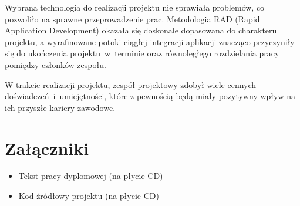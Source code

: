 Wybrana technologia do realizacji projektu nie sprawiała problemów, co pozwoliło na sprawne przeprowadzenie prac.
Metodologia RAD (Rapid Application Development) okazała się doskonale dopasowana do charakteru projektu, a wyrafinowane potoki ciągłej integracji aplikacji znacząco przyczyniły się do ukończenia projektu~w~terminie oraz równoległego rozdzielania pracy pomiędzy członków zespołu.

W trakcie realizacji projektu, zespół projektowy zdobył wiele cennych doświadczeń~i~umiejętności, które z pewnością będą miały pozytywny wpływ na ich przyszłe kariery zawodowe.

\chapter*{Załączniki}
\begin{itemize}
    \item Tekst pracy dyplomowej (na płycie CD)
    \item Kod źródłowy projektu (na płycie CD)
\end{itemize}
